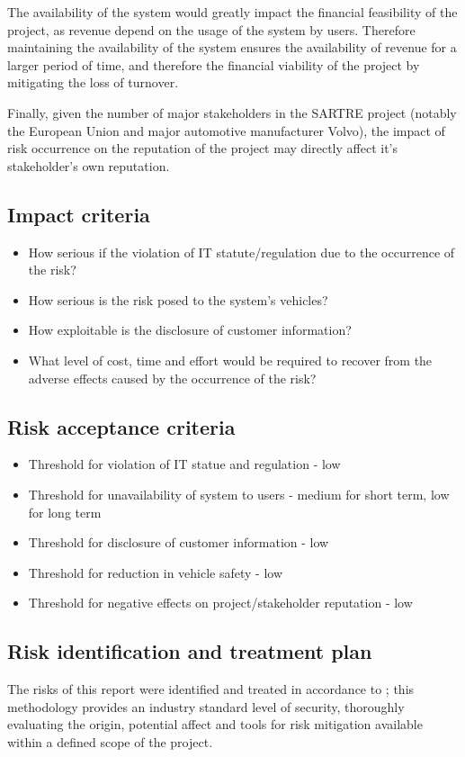 \documentclass[british,11pt,a4paper]{article}
\begin{document}
The availability of the system would greatly impact the financial feasibility of the project, as revenue depend on the usage of the system by users. Therefore maintaining the availability of the system ensures the availability of revenue for a larger period of time, and therefore the financial viability of the project by mitigating the loss of turnover.

Finally, given the number of major stakeholders in the SARTRE project (notably the European Union and major automotive manufacturer Volvo), the impact of risk occurrence on the reputation of the project may directly affect it's stakeholder's own reputation.

\subsection{Impact criteria}
\begin{itemize}
	\setlength\itemsep{-0.3em}
	\item How serious if the violation of IT statute/regulation due to the occurrence of the risk?
	\item How serious is the risk posed to the system's vehicles?
	\item How exploitable is the disclosure of customer information?
	\item What level of cost, time and effort would be required to recover from the adverse effects caused by the occurrence of the risk?
\end{itemize}

\subsection{Risk acceptance criteria}
\begin{itemize}
	\setlength\itemsep{-0.3em}
	\item Threshold for violation of IT statue and regulation - low
	\item Threshold for unavailability of system to users - medium for short term, low for long term
	\item Threshold for disclosure of customer information - low
	\item Threshold for reduction in vehicle safety - low
	\item Threshold for negative effects on project/stakeholder reputation - low
\end{itemize}

\clearpage
\subsection{Risk identification and treatment plan}
The risks of this report were identified and treated in accordance to \citet{ISO_27005}; this methodology provides an industry standard level of security, thoroughly evaluating the origin, potential affect and tools for risk mitigation available within a defined scope of the project.
\end{document}
